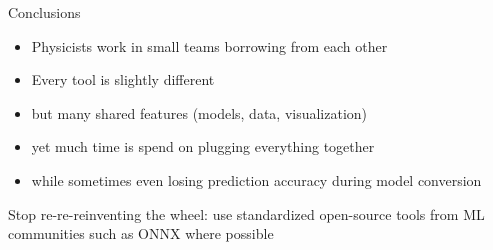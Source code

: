 \documentclass[aspectratio=169,9pt]{beamer}
\begin{document}
\begin{frame}[t]{Conclusions}
  \begin{itemize}
    \item Physicists work in small teams borrowing from each other
    \item Every tool is slightly different
    \item but many shared features (models, data, visualization)
    \item yet much time is spend on plugging everything together
    \item while sometimes even losing prediction accuracy during model conversion
  \end{itemize}
  \vspace*{.5cm}
  Stop re-re-reinventing the wheel: use standardized open-source tools from ML communities such as ONNX where possible\\\vspace*{1cm}
\end{frame}


\end{document}
